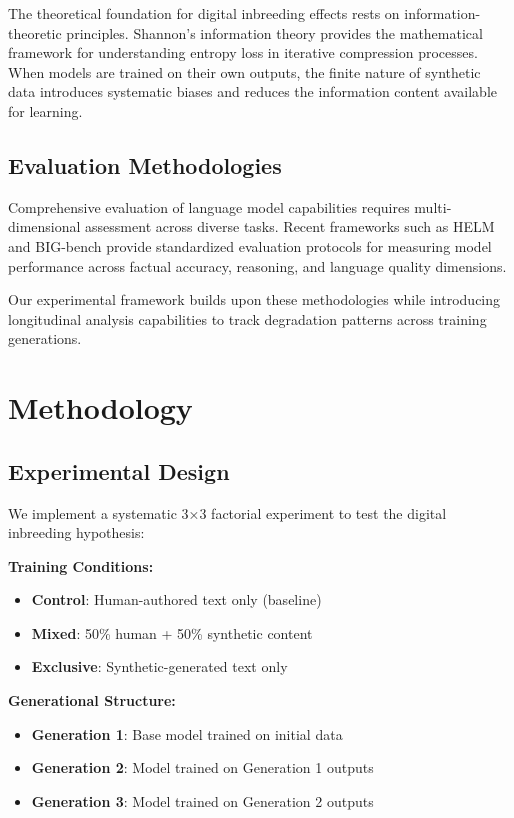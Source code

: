 \documentclass[letterpaper]{article}
\begin{document}
The theoretical foundation for digital inbreeding effects rests on information-theoretic principles. Shannon's information theory \cite{shannon1948mathematical} provides the mathematical framework for understanding entropy loss in iterative compression processes. When models are trained on their own outputs, the finite nature of synthetic data introduces systematic biases and reduces the information content available for learning.

\subsection{Evaluation Methodologies}

Comprehensive evaluation of language model capabilities requires multi-dimensional assessment across diverse tasks. Recent frameworks such as HELM \cite{liang2022holistic} and BIG-bench \cite{srivastava2022beyond} provide standardized evaluation protocols for measuring model performance across factual accuracy, reasoning, and language quality dimensions.

Our experimental framework builds upon these methodologies while introducing longitudinal analysis capabilities to track degradation patterns across training generations.

\section{Methodology}

\subsection{Experimental Design}

We implement a systematic 3×3 factorial experiment to test the digital inbreeding hypothesis:

\textbf{Training Conditions:}
\begin{itemize}
\item \textbf{Control}: Human-authored text only (baseline)
\item \textbf{Mixed}: 50\% human + 50\% synthetic content
\item \textbf{Exclusive}: Synthetic-generated text only
\end{itemize}

\textbf{Generational Structure:}
\begin{itemize}
\item \textbf{Generation 1}: Base model trained on initial data
\item \textbf{Generation 2}: Model trained on Generation 1 outputs
\item \textbf{Generation 3}: Model trained on Generation 2 outputs
\end{itemize}
\end{document}
